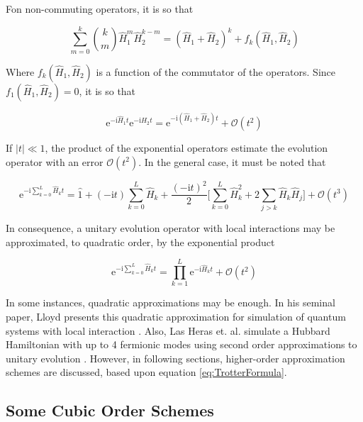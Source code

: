  Fon non-commuting operators, it is so that

  \begin{equation}
    \sum_{m = 0}^k \binom{k}{m} \hat{H}_1^m \hat{H}_2^{k-m} = (\hat{H}_1 + \hat{H}_2)^k + f_k(\hat{H}_1,\hat{H}_2)
    \label{eq:BinomialTheorem}
  \end{equation}

  Where $f_k(\hat{H}_1,\hat{H}_2)$ is a function of the commutator of the operators. Since $f_1(\hat{H}_1,\hat{H}_2) = 0$, it is so that

  \begin{equation}
    \mathrm{e}^{-\mathrm{i}\hat{H}_1 t}\mathrm{e}^{-\mathrm{i}\hat{H}_2 t} = \mathrm{e}^{-\mathrm{i}(\hat{H}_1 + \hat{H}_2) t} + \mathcal{O}(t^2)
    \label{eq:O2Approx}
  \end{equation}

  If $|t| \ll 1$, the product of the exponential operators estimate the evolution operator with an error $\mathcal{O}(t^2)$. In the general case, it must be noted that

  \begin{equation}
    \mathrm{e}^{-\mathrm{i}\sum_{k = 0}^L \hat{H}_k t} = \hat{1} + (-\mathrm{i}t)\sum_{k = 0}^L \hat{H}_k + \frac{(-\mathrm{i}t)^2}{2} \Bigg[\sum_{k = 0}^L \hat{H}_k^2 + 2 \sum_{j > k}\hat{H}_k \hat{H}_j\Bigg] + \mathcal{O}(t^3)
    \label{eq:TrotterFormula}
  \end{equation}

  In consequence, a unitary evolution operator with local interactions may be approximated, to quadratic order, by the exponential product

  \begin{equation}
    \mathrm{e}^{-\mathrm{i}\sum_{k = 0}^L \hat{H}_k t} = \prod_{k = 1}^{L} \mathrm{e}^{-\mathrm{i}\hat{H}_kt} + \mathcal{O}(t^2)
    \label{eq:2ndOrderTrotter}
  \end{equation}

  In some instances, quadratic approximations may be enough. In his seminal paper, Lloyd presents this quadratic approximation for simulation of quantum systems with local interaction \cite{LloydNature}. Also, Las Heras et. al. simulate a Hubbard Hamiltonian with up to 4 fermionic modes using second order approximations to unitary evolution \cite{HubbardSimul, HubbardSimulLasHeras}. However, in following sections, higher-order approximation schemes are discussed, based upon equation \ref{eq:TrotterFormula}.

  \subsection{Some Cubic Order Schemes}

